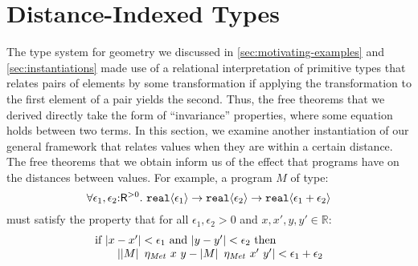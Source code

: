 \section{Distance-Indexed Types}
\label{sec:metric-types}

\newcommand{\Metric}{\mathit{Met}}
\newcommand{\metricSort}{\mathsf{R}^{>0}}

The type system for geometry we discussed in
\autoref{sec:motivating-examples} and \autoref{sec:instantiations}
made use of a relational interpretation of primitive types that
relates pairs of elements by some transformation if applying the
transformation to the first element of a pair yields the second. Thus,
the free theorems that we derived directly take the form of
``invariance'' properties, where some equation holds between two
terms. In this section, we examine another instantiation of our
general framework that relates values when they are within a certain
distance. The free theorems that we obtain inform us of the effect
that programs have on the distances between values. For example, a
program $M$ of type:
\begin{displaymath}
  \forall \epsilon_1,\epsilon_2\mathord:\metricSort.\ \tyPrim{real}{\epsilon_1} \to \tyPrim{real}{\epsilon_2} \to \tyPrim{real}{\epsilon_1 + \epsilon_2}
\end{displaymath}
must satisfy the property that for all $\epsilon_1, \epsilon_2 > 0$
and $x, x', y, y' \in \mathbb{R}$:
\begin{displaymath}
  \begin{array}{l}
    \textrm{if }\abs{x - x'} < \epsilon_1 \textrm{ and } \abs{y - y'} < \epsilon_2 \textrm{ then}\\
    \hspace{2em}\abs{\tmSem{M}\ \eta_\Metric\ x\ y - \tmSem{M}\ \eta_\Metric\ x'\ y'} < \epsilon_1 + \epsilon_2
  \end{array}
\end{displaymath}

